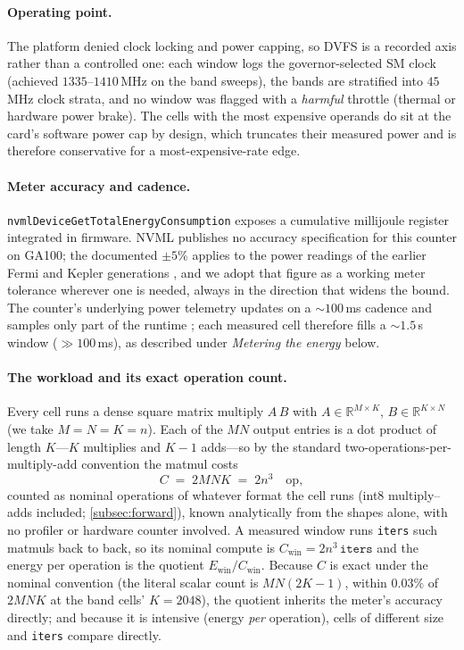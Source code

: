 \documentclass{article}
\theoremstyle{plain}
\theoremstyle{definition}
\theoremstyle{remark}
\begin{document}
\paragraph{Operating point.}
The platform denied clock locking and power capping, so DVFS is a recorded
axis rather than a controlled one: each window logs the governor-selected
SM clock (achieved $1335$--$1410$\,MHz on the band sweeps), the bands are
stratified into $45$\,MHz clock strata, and no window was flagged with a
\emph{harmful} throttle (thermal or hardware power brake). The cells with
the most expensive operands do sit at the card's software power cap by design, which
truncates their measured power and is therefore conservative for a
most-expensive-rate edge.

\paragraph{Meter accuracy and cadence.}
\texttt{nvmlDeviceGetTotalEnergyConsumption} exposes a cumulative
millijoule register integrated in firmware. NVML publishes no accuracy
specification for this counter on GA100; the documented $\pm 5\%$ applies
to the power readings of the earlier Fermi and Kepler generations
\citep{nvidia_nvml}, and we
adopt that figure as a working meter tolerance wherever one is needed,
always in the direction that widens the bound. The counter's underlying
power telemetry updates on a ${\sim}100$\,ms cadence and samples only part
of the runtime \citep{yang2023parttime}; each measured cell therefore
fills a ${\sim}1.5$\,s window (${\gg}100$\,ms), as described under
\emph{Metering the energy} below.

\paragraph{The workload and its exact operation count.}
Every cell runs a dense square matrix multiply $A\,B$ with
$A\in\mathbb{R}^{M\times K}$, $B\in\mathbb{R}^{K\times N}$ (we take
$M=N=K=n$). Each of the $MN$ output entries is a dot product of length
$K$---$K$ multiplies and $K{-}1$ adds---so by the standard
two-operations-per-multiply-add convention the matmul costs
\begin{equation}
	C \;=\; 2MNK \;=\; 2n^3 \quad \text{op},
	\label{eq:flopcount}
\end{equation}
counted as nominal operations of whatever format the cell runs (int8
multiply--adds included; \cref{subsec:forward}),
known analytically from the shapes alone, with no profiler or
hardware counter involved. A measured window runs \texttt{iters} such
matmuls back to back, so its nominal compute is
$C_{\mathrm{win}} = 2n^3\,\texttt{iters}$ and the energy per operation is
the quotient $E_{\mathrm{win}} / C_{\mathrm{win}}$. Because $C$ is exact under the
nominal convention (the literal scalar count is $MN(2K-1)$, within
$0.03\%$ of $2MNK$ at the band cells' $K = 2048$), the quotient
inherits the meter's accuracy directly; and because it is intensive
(energy \emph{per} operation), cells of different size and \texttt{iters}
compare directly.
\end{document}
